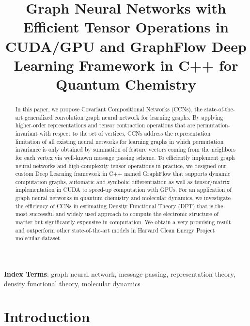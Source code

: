 \documentclass[a4paper]{article}
\title{Graph Neural Networks with Efficient Tensor Operations in CUDA/GPU and GraphFlow Deep Learning Framework in C++ for Quantum Chemistry}
\begin{document}
\maketitle
% 
\begin{abstract}
In this paper, we propose Covariant Compositional Networks (CCNs), the state-of-the-art generalized convolution graph neural network for learning graphs. By applying higher-order representations and tensor contraction operations that are permutation-invariant with respect to the set of vertices, CCNs address the representation limitation of all existing neural networks for learning graphs in which permutation invariance is only obtained by summation of feature vectors coming from the neighbors for each vertex via well-known message passing scheme. To efficiently implement graph neural networks and high-complexity tensor operations in practice, we designed our custom Deep Learning framework in C++ named GraphFlow that supports dynamic computation graphs, automatic and symbolic differentiation as well as tensor/matrix implementation in CUDA to speed-up computation with GPUs. For an application of graph neural networks in quantum chemistry and molecular dynamics, we investigate the efficiency of CCNs in estimating Density Functional Theory (DFT) that is the most successful and widely used approach to compute the electronic structure of matter but significantly expensive in computation. We obtain a very promising result and outperform other state-of-the-art models in Harvard Clean Energy Project molecular dataset. \\
\end{abstract}
\noindent\textbf{Index Terms}: graph neural network, message passing, representation theory, density functional theory, molecular dynamics

\section{Introduction}
\end{document}
